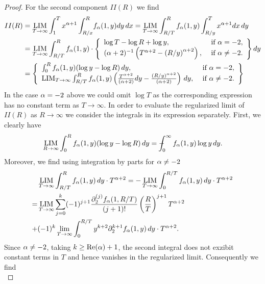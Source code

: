 \begin{proof}
For the second component $II(R)$ we find
\begin{align*}
II(R) &= \LIM_{T\to\infty} \int_1^T x^{\A+1} \int_{R/x}^R \!f_\A(1,y) dy \, dx 
= \LIM_{T\to\infty}  \int_{R/T}^R f_\A(1,y) \int_{R/y}^T x^{\A+1} dx \, dy \\
&= \LIM_{T\to\infty}  \int_{R/T}^R f_\A(1,y) \cdot \left\{ 
\begin{array}{ll}
\log T - \log R + \log y, \ &\textup{if} \ \A=-2, \\
(\A+2)^{-1} \left(T^{\A+2}-\left(R/y\right)^{\A+2}\right), \ &\textup{if} \ \A\neq -2.
\end{array}
\right\} dy \\
&= \left\{
\begin{array}{ll}
\int_{0}^R f_\A(1,y) (\log y - \log R) \, dy, \ &\textup{if} \ \A=-2, \\
\LIM_{T\to\infty}  \int_{R/T}^R f_\A(1,y) \left(\frac{T^{\A+2}}{(\A+2)} dy
- \frac{(R/y)^{\A+2}}{(\A+2)}\right) \, dy, \ &\textup{if} \ \A\neq -2.
\end{array}
\right\}
\end{align*}
In the case $\mathrm{\alpha}=-2$ above we could omit $\log T$
as the corresponding expression has no constant term 
as $T\to \infty$. In order to evaluate the regularized limit of $II(R)$ as $R\to \infty$ 
we consider the integrals in its expression separately. First, we clearly have
\begin{equation}
\operatorname*{LIM}_{R\to \infty} 
\int_{0}^R f_{\mathrm{\alpha}}(1,y) (\log y - \log R) \, dy
= -\hspace*{-1em}\int_{0}^\infty f_{\mathrm{\alpha}}(1,y) \log y \, dy.
\end{equation}
Moreover, we find
using integration by parts for $\mathrm{\alpha} \neq -2$
\begin{equation}
\begin{split}
&\operatorname*{LIM}_{T\to\infty} \int_{R/T}^R f_{\mathrm{\alpha}}(1,y)\, dy \cdot T^{\mathrm{\alpha}+2} 
= - \operatorname*{LIM}_{T\to\infty} \int_{0}^{R/T} f_{\mathrm{\alpha}}(1,y) \, dy \cdot T^{\mathrm{\alpha}+2} \\
= &\operatorname*{LIM}_{T\to\infty}  \sum_{j=0}^{k} (-1)^{j+1}\frac{\partial_2^{(j)}f_{\mathrm{\alpha}}(1,R/T)}{(j+1)!} 
\left(\frac{R}{T}\right)^{j+1} T^{\mathrm{\alpha}+2} \\
+ &(-1)^k \lim_{T\to\infty}  \int_{0}^{R/T} y^{k+2} \partial_2^{k+1} f_{\mathrm{\alpha}}(1,y)\, dy \cdot T^{\mathrm{\alpha}+2} .
\end{split}
\end{equation}
Since $\mathrm{\alpha} \neq -2$, taking $k \geq \textup{Re}(\mathrm{\alpha})+1$, the second integral does not exzibit constant terms in $T$ 
and hence vanishes in the regularized limit. Consequently we find
\begin{equation}

\end{equation}
\end{proof}
